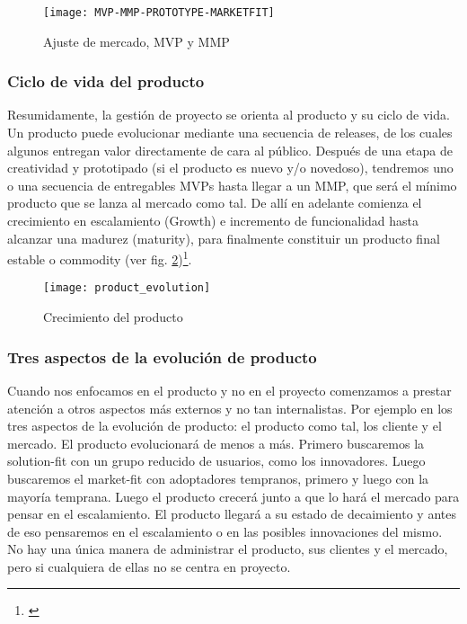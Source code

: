 \begin{figure}[h]
  \centering
  \texttt{[image: MVP-MMP-PROTOTYPE-MARKETFIT]}
  \caption{Ajuste de mercado, MVP y MMP}
  \centering
  \label{fig:MVP-MMP-PROTOTYPE-MARKETFIT} %
\end{figure}
\FloatBarrier %


\subsubsection{Ciclo de vida del producto}

Resumidamente, la gestión de proyecto se orienta al producto y su ciclo de vida. Un producto puede evolucionar mediante una secuencia de releases, de los cuales algunos entregan valor directamente de cara al público. Después de una etapa de creatividad y prototipado (si el producto es nuevo y/o novedoso), tendremos uno o una secuencia de entregables MVPs hasta llegar a un MMP, que será el mínimo producto que se lanza al mercado como tal. De allí en adelante comienza el crecimiento en escalamiento (Growth) e incremento de funcionalidad hasta alcanzar una madurez (maturity), para finalmente constituir un producto final estable o commodity (ver fig. \ref{fig:product_evolution})\footnote{\cite{Greg-Gehrich-2012}}.

\begin{figure}[h]
  \centering
  \texttt{[image: product\_evolution]}
  \caption{Crecimiento del producto}
  \centering
  \label{fig:product_evolution} %
\end{figure}
\FloatBarrier %

\subsubsection{Tres aspectos de la evolución de producto}

Cuando nos enfocamos en el producto y no en el proyecto comenzamos a prestar atención a otros aspectos más externos y no tan internalistas. Por ejemplo en los tres aspectos de la evolución de producto: el producto como tal, los cliente y el mercado. El producto evolucionará de menos a más. Primero buscaremos la solution-fit con un grupo reducido de usuarios, como los innovadores. Luego buscaremos el market-fit con adoptadores tempranos, primero y luego con la mayoría temprana. Luego el producto crecerá junto a que lo hará el mercado para pensar en el escalamiento. El producto llegará a su estado de decaimiento y antes de eso pensaremos en el escalamiento o en las posibles innovaciones del mismo. No hay una única manera de administrar el producto, sus clientes y el mercado, pero si cualquiera de ellas no se centra en proyecto.


